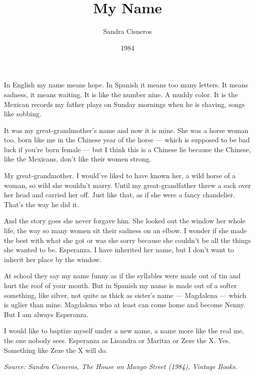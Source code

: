 \documentclass[10pt,a4paper]{article}
\begin{document}
\title{My Name}
\date{1984}
\author{Sandra Cisneros}

\maketitle

\noindent\linenumbers In English my name means hope. In Spanish it means too many letters. It means sadness, it means waiting. It is like the number nine. A muddy color. It is the Mexican records my father plays on Sunday mornings when he is shaving, songs like sobbing.

It was my great-grandmother's name and now it is mine. She was a horse woman too, born like me in the Chinese year of the horse — which is supposed to be bad luck if you're born female — but I think this is a Chinese lie because the Chinese, like the Mexicans, don't like their women strong.

My great-grandmother. I would've liked to have known her, a wild horse of a woman, so wild she wouldn't marry. Until my great-grandfather threw a sack over her head and carried her off. Just like that, as if she were a fancy chandelier. That's the way he did it.

And the story goes she never forgave him. She looked out the window her whole life, the way so many women sit their sadness on an elbow. I wonder if she made the best with what she got or was she sorry because she couldn't be all the things she wanted to be. Esperanza. I have inherited her name, but I don't want to inherit her place by the window.

At school they say my name funny as if the syllables were made out of tin and hurt the roof of your mouth. But in Spanish my name is made out of a softer something, like silver, not quite as thick as sister's name --- Magdalena --- which is uglier than mine. Magdalena who at least can come home and become Nenny. But I am always Esperanza.

I would like to baptize myself under a new name, a name more like the real me, the one nobody sees. Esperanza as Lisandra or Maritza or Zeze the X. Yes. Something like Zeze the X will do.

\bigskip
\noindent\textit{Source: Sandra Cisneros, \textit{The House on Mango Street} (1984), Vintage Books.}
\end{document}

